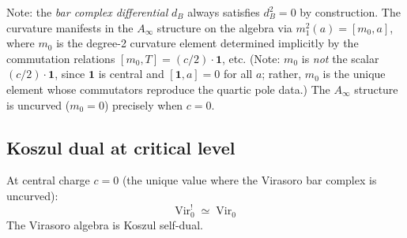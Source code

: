 \begin{computation}
Note: the \emph{bar complex differential} $d_B$ always satisfies $d_B^2 = 0$ by construction.  The curvature manifests in the $A_\infty$ structure on the algebra via $m_1^2(a) = [m_0, a]$, where $m_0$ is the degree-2 curvature element determined implicitly by the commutation relations $[m_0, T] = (c/2)\cdot\mathbf{1}$, etc.  (Note: $m_0$ is \emph{not} the scalar $(c/2)\cdot\mathbf{1}$, since $\mathbf{1}$ is central and $[\mathbf{1}, a] = 0$ for all $a$; rather, $m_0$ is the unique element whose commutators reproduce the quartic pole data.)
The $A_\infty$ structure is uncurved ($m_0 = 0$) precisely when $c = 0$.
\end{computation}

\subsection{Koszul dual at critical level}

\begin{theorem}[Virasoro self-duality at \texorpdfstring{$c=0$}{c=0}; \ClaimStatusProvedHere]
\label{thm:virasoro-self-duality}
At central charge $c = 0$ (the unique value where the Virasoro bar complex
is uncurved):
\begin{equation}
\mathrm{Vir}_0^! \;\simeq\; \mathrm{Vir}_0
\end{equation}
The Virasoro algebra is Koszul self-dual.
\end{theorem}

